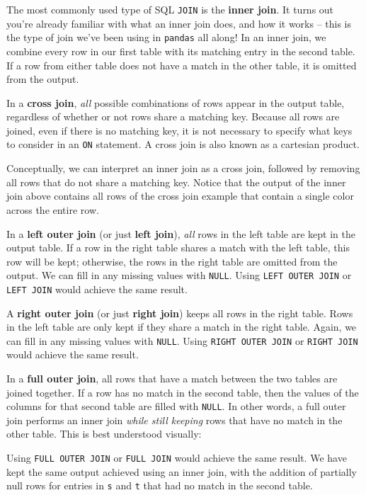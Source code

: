 \documentclass[
  letterpaper,
  DIV=11,
  numbers=noendperiod]{scrreprt}
\begin{document}
The most commonly used type of SQL \texttt{JOIN} is the \textbf{inner
join}. It turns out you're already familiar with what an inner join
does, and how it works -- this is the type of join we've been using in
\texttt{pandas} all along! In an inner join, we combine every row in our
first table with its matching entry in the second table. If a row from
either table does not have a match in the other table, it is omitted
from the output.

In a \textbf{cross join}, \emph{all} possible combinations of rows
appear in the output table, regardless of whether or not rows share a
matching key. Because all rows are joined, even if there is no matching
key, it is not necessary to specify what keys to consider in an
\texttt{ON} statement. A cross join is also known as a cartesian
product.

Conceptually, we can interpret an inner join as a cross join, followed
by removing all rows that do not share a matching key. Notice that the
output of the inner join above contains all rows of the cross join
example that contain a single color across the entire row.

In a \textbf{left outer join} (or just \textbf{left join}), \emph{all}
rows in the left table are kept in the output table. If a row in the
right table shares a match with the left table, this row will be kept;
otherwise, the rows in the right table are omitted from the output. We
can fill in any missing values with \texttt{NULL}. Using
\texttt{LEFT\ OUTER\ JOIN} or \texttt{LEFT\ JOIN} would achieve the same
result.

A \textbf{right outer join} (or just \textbf{right join}) keeps all rows
in the right table. Rows in the left table are only kept if they share a
match in the right table. Again, we can fill in any missing values with
\texttt{NULL}. Using \texttt{RIGHT\ OUTER\ JOIN} or \texttt{RIGHT\ JOIN}
would achieve the same result.

In a \textbf{full outer join}, all rows that have a match between the
two tables are joined together. If a row has no match in the second
table, then the values of the columns for that second table are filled
with \texttt{NULL}. In other words, a full outer join performs an inner
join \emph{while still keeping} rows that have no match in the other
table. This is best understood visually:

Using \texttt{FULL\ OUTER\ JOIN} or \texttt{FULL\ JOIN} would achieve
the same result. We have kept the same output achieved using an inner
join, with the addition of partially null rows for entries in \texttt{s}
and \texttt{t} that had no match in the second table.
\end{document}
